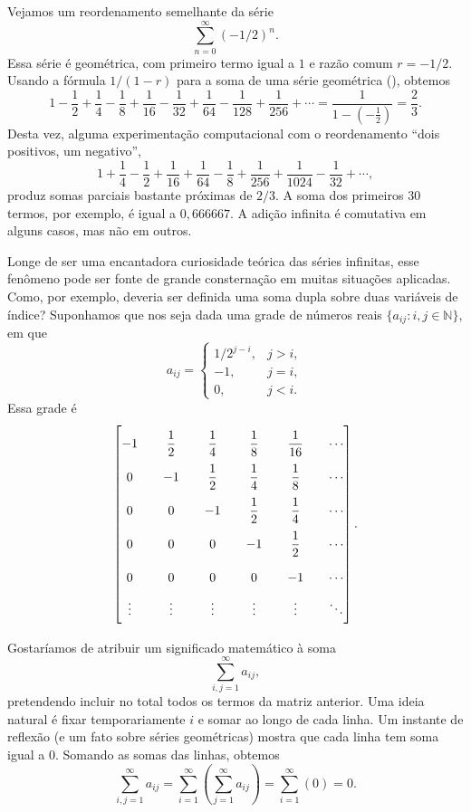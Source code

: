 Vejamos um reordenamento semelhante da série
\[
\sum_{n=0}^{\infty}(-1/2)^n.
\]
Essa série é geométrica, com primeiro termo igual a $1$ e razão comum $r=-1/2$. Usando a fórmula $1/(1-r)$ para a soma de uma série geométrica (), obtemos  
\[
1-\frac{1}{2}+\frac{1}{4}-\frac{1}{8}+\frac{1}{16}-\frac{1}{32}+\frac{1}{64}-\frac{1}{128}+\frac{1}{256}+\cdots
=\frac{1}{1-(-\frac{1}{2})}=\frac{2}{3}.
\]
Desta vez, alguma experimentação computacional com o reordenamento ``dois positivos, um negativo'',
\[
1+\frac{1}{4}-\frac{1}{2}+\frac{1}{16}+\frac{1}{64}-\frac{1}{8}+\frac{1}{256}+\frac{1}{1024}-\frac{1}{32}+\cdots,
\]
produz somas parciais bastante próximas de $2/3$. A soma dos primeiros $30$ termos, por exemplo, é igual a $0{,}666667$. A adição infinita é comutativa em alguns casos, mas não em outros.

Longe de ser uma encantadora curiosidade teórica das séries infinitas, esse fenômeno pode ser fonte de grande consternação em muitas situações aplicadas. Como, por exemplo, deveria ser definida uma soma dupla sobre duas variáveis de índice? Suponhamos que nos seja dada uma grade de números reais $\{a_{ij}:i,j\in\mathbb{N}\}$, em que 
\[
a_{ij}=\begin{cases}
1/2^{j-i},& j>i,\\
-1,& j=i,\\
0,& j<i.
\end{cases}
\]
Essa grade é
\[
\renewcommand{\arraystretch}{2.2}
\setlength{\arraycolsep}{10pt}
\begin{bmatrix}
-1&\dfrac12&\dfrac14&\dfrac18&\dfrac1{16}&\cdots\\
0&-1&\dfrac12&\dfrac14&\dfrac18&\cdots\\
0&0&-1&\dfrac12&\dfrac14&\cdots\\
0&0&0&-1&\dfrac12&\cdots\\
0&0&0&0&-1&\cdots\\
\vdots&\vdots&\vdots&\vdots&\vdots&\ddots
\end{bmatrix}.
\]

Gostaríamos de atribuir um significado matemático à soma
\[
\sum_{i,j=1}^{\infty}a_{ij},
\]
pretendendo incluir no total todos os termos da matriz anterior. Uma ideia natural é fixar temporariamente $i$ e somar ao longo de cada linha. Um instante de reflexão (e um fato sobre séries geométricas) mostra que cada linha tem soma igual a $0$. Somando as somas das linhas, obtemos 
\[
\sum_{i,j=1}^{\infty}a_{ij}
=\sum_{i=1}^{\infty}\left(\sum_{j=1}^{\infty}a_{ij}\right)
=\sum_{i=1}^{\infty}(0)=0.
\]

